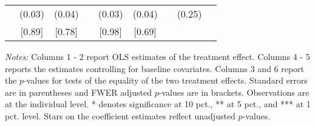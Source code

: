 \begin{table}[htbp]
{\begin{threeparttable}
\begin{tabular}{l*{8}{c}}
          &   (0.03)&   (0.04)&         &   (0.03)&   (0.04)&         &   (0.25)&         \\
          &   [0.89]&   [0.78]&         &   [0.98]&   [0.69]&         &         &         \\
\bottomrule \end{tabular} \begin{tablenotes}[flushleft] \footnotesize \item \emph{Notes:} Columns 1 - 2 report OLS estimates of the treatment effect. Columns 4 - 5 reports the estimates controlling for baseline covariates. Columns 3 and 6 report the \(p\)-values for tests of the equality of the two treatment effects. Standard errors are in parentheses and FWER adjusted \(p\)-values are in brackets. Observations are at the individual level. * denotes significance at 10 pct., ** at 5 pct., and *** at 1 pct. level. Stars on the coefficient estimates reflect unadjusted \(p\)-values. \end{tablenotes} \end{threeparttable} } \end{table}

